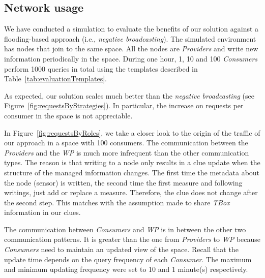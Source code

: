 


\subsection{Network usage} %
\label{sec:NetworkUsage}


We have conducted a simulation to evaluate the benefits of our solution against a flooding-based approach (i.e., \emph{negative broadcasting}).
The simulated environment has nodes that join to the same space.
All the nodes are \emph{Providers} and write new information periodically in the space.
During one hour, 1, 10 and 100 \emph{Consumers} perform 1000 queries in total using the templates described in Table~\ref{tab:evaluationTemplates}.

As expected, our solution scales much better than the \emph{negative broadcasting} (see Figure~\ref{fig:requestsByStrategies}).
In particular, the increase on requests per consumer in the space is not appreciable.




In Figure~\ref{fig:requestsByRoles}, we take a closer look to the origin of the traffic of our approach in a space with 100 consumers.
The communication between the \emph{Providers} and the \emph{WP} is much more infrequent than the other communication types.
The reason is that writing to a node only results in a clue update when the structure of the managed information changes.
The first time the metadata about the node (sensor) is written, the second time the first measure and following writings, just add or replace a measure.
Therefore, the clue does not change after the second step.
This matches with the assumption made to share \emph{TBox} information in our clues.

The communication between \emph{Consumers} and \emph{WP} is in between the other two communication patterns.
It is greater than the one from \emph{Providers} to \emph{WP} because \emph{Consumers} need to maintain an updated view of the space.
Recall that the update time depends on the query frequency of each \emph{Consumer}.
The maximum and minimum updating frequency were set to 10 and 1 minute(s) respectively.

